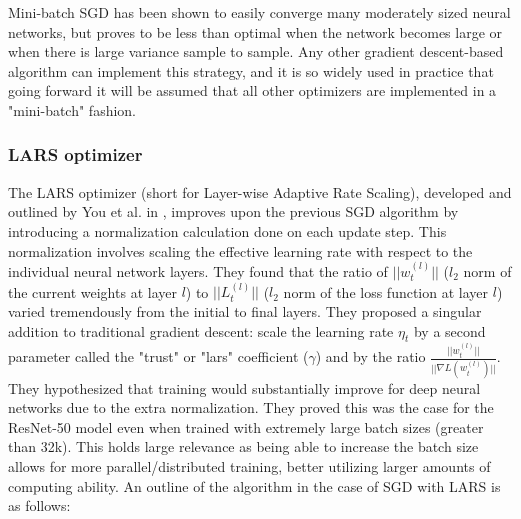 Mini-batch SGD has been shown to easily converge many moderately sized neural networks, but proves to be less than optimal when the network becomes large or when there is large variance sample to sample. Any other gradient descent-based algorithm can implement this strategy, and it is so widely used in practice that going forward it will be assumed that all other optimizers are implemented in a "mini-batch" fashion.
\subsubsection{LARS optimizer}

The LARS optimizer (short for Layer-wise Adaptive Rate Scaling), developed and outlined by You et al. in \cite{ginsburg2018large}, improves upon the previous SGD algorithm by introducing a normalization calculation done on each update step. This normalization involves scaling the effective learning rate with respect to the individual neural network layers. They found that the ratio of $||w_t^{(l)}||$ ($l_2$ norm of the current weights at layer $l$) to $||L_t^{(l)}||$ ($l_2$ norm of the loss function at layer $l$) varied tremendously from the initial to final layers. They proposed a singular addition to traditional gradient descent: scale the learning rate $\eta_t$ by a second parameter called the "trust" or "lars" coefficient ($\gamma$) and by the ratio $\frac{||w_t^{(l)}||}{||\nabla L(w_t^{(l)})||}$. They hypothesized that training would substantially improve for deep neural networks due to the extra normalization. They proved this was the case for the ResNet-50 model even when trained with extremely large batch sizes (greater than 32k)\cite{ginsburg2018large}. This holds large relevance as being able to increase the batch size allows for more parallel/distributed training, better utilizing larger amounts of computing ability. An outline of the algorithm in the case of SGD with LARS is as follows:
